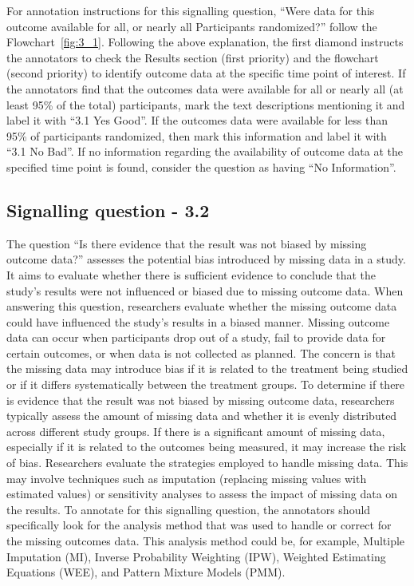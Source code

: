 \documentclass[sn-mathphys,Numbered]{sn-jnl}%
\begin{document}
For annotation instructions for this signalling question, ``Were data for this outcome available for all, or nearly all Participants randomized?'' follow the Flowchart~\ref{fig:3_1}.
Following the above explanation, the first diamond instructs the annotators to check the Results section (first priority) and the flowchart (second priority) to identify outcome data at the specific time point of interest.
If the annotators find that the outcomes data were available for all or nearly all (at least 95\% of the total) participants, mark the text descriptions mentioning it and label it with ``3.1 Yes Good''.
If the outcomes data were available for less than 95\% of participants randomized, then mark this information and label it with ``3.1 No Bad''.
If no information regarding the availability of outcome data at the specified time point is found, consider the question as having ``No Information''.
%
%
%
\subsection*{Signalling question - 3.2 }
%
The question ``Is there evidence that the result was not biased by missing outcome data?'' assesses the potential bias introduced by missing data in a study.
It aims to evaluate whether there is sufficient evidence to conclude that the study's results were not influenced or biased due to missing outcome data.
When answering this question, researchers evaluate whether the missing outcome data could have influenced the study's results in a biased manner.
Missing outcome data can occur when participants drop out of a study, fail to provide data for certain outcomes, or when data is not collected as planned.
The concern is that the missing data may introduce bias if it is related to the treatment being studied or if it differs systematically between the treatment groups.
To determine if there is evidence that the result was not biased by missing outcome data, researchers typically assess the amount of missing data and whether it is evenly distributed across different study groups.
If there is a significant amount of missing data, especially if it is related to the outcomes being measured, it may increase the risk of bias.
Researchers evaluate the strategies employed to handle missing data.
This may involve techniques such as imputation (replacing missing values with estimated values) or sensitivity analyses to assess the impact of missing data on the results.
To annotate for this signalling question, the annotators should specifically look for the analysis method that was used to handle or correct for the missing outcomes data.
This analysis method could be, for example, Multiple Imputation (MI), Inverse Probability Weighting (IPW), Weighted Estimating Equations (WEE), and Pattern Mixture Models (PMM).
\end{document}
